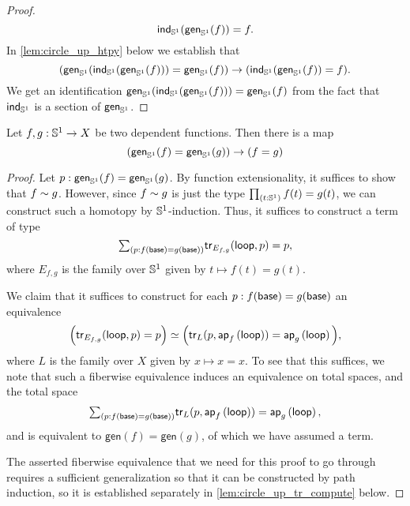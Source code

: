 \begin{proof}
\begin{equation*}
\mathsf{ind}_{\mathbb{S}^{1}}(\mathsf{gen}_{\mathbb{S}^{1}}(f))=f.
\end{equation*}
In \cref{lem:circle_up_htpy} below we establish that
\begin{equation*}
(\mathsf{gen}_{\mathbb{S}^{1}}(\mathsf{ind}_{\mathbb{S}^{1}}(\mathsf{gen}_{\mathbb{S}^{1}}(f)))=\mathsf{gen}_{\mathbb{S}^{1}}(f))\to (\mathsf{ind}_{\mathbb{S}^{1}}(\mathsf{gen}_{\mathbb{S}^{1}}(f))=f).
\end{equation*}
We get an identification $\mathsf{gen}_{\mathbb{S}^{1}}(\mathsf{ind}_{\mathbb{S}^{1}}(\mathsf{gen}_{\mathbb{S}^{1}}(f)))=\mathsf{gen}_{\mathbb{S}^{1}}(f)$ from the fact that $\mathsf{ind}_{\mathbb{S}^{1}}$ is a section of $\mathsf{gen}_{\mathbb{S}^{1}}$.
\end{proof}

\begin{lem}\label{lem:circle_up_htpy}
Let $f,g:\mathbb{S}^{1}\to X$ be two dependent functions. Then there is a map
\begin{equation*}
(\mathsf{gen}_{\mathbb{S}^{1}}(f)=\mathsf{gen}_{\mathbb{S}^{1}}(g))\to (f=g)
\end{equation*}
\end{lem}

\begin{proof}
Let $p:\mathsf{gen}_{\mathbb{S}^{1}}(f)=\mathsf{gen}_{\mathbb{S}^{1}}(g)$. By function extensionality, it suffices to show that $f\sim g$. However, since $f\sim g$ is just the type $\prd{t:\sphere{1}}f(t)=g(t)$, we can construct such a homotopy by $\mathbb{S}^{1}$-induction. Thus, it suffices to construct a term of type
\begin{equation*}
\sm{p:f(\base)=g(\base)} \mathsf{tr}_{E_{f,g}}(\lloop,p)=p, 
\end{equation*}
where $E_{f,g}$ is the family over $\mathbb{S}^{1}$ given by $t\mapsto f(t)=g(t)$.

We claim that it suffices to construct for each $p:f(\mathsf{base})=g(\mathsf{base})$ an equivalence
\begin{equation*}
\Big(\mathsf{tr}_{E_{f,g}}(\mathsf{loop},p)=p\Big)\simeq\Big(\mathsf{tr}_{L}(p,\mathsf{ap}_{f}\left({\mathsf{loop}}\right))=\mathsf{ap}_{g}\left({\mathsf{loop}}\right)\Big),
\end{equation*}
where $L$ is the family over $X$ given by $x\mapsto x=x$. 
To see that this suffices, we note that such a fiberwise equivalence induces an equivalence on total spaces, and the total space
\begin{align*}
\sm{p:f(\base)=g(\base)} \mathsf{tr}_{L}(p,\ap{f}{\lloop})=\ap{g}{\lloop},
\end{align*}
and is equivalent to $\mathsf{gen}(f)=\mathsf{gen}(g)$, of which we have assumed a term.

The asserted fiberwise equivalence that we need for this proof to go through requires a sufficient generalization so that it can be constructed by path induction, so it is established separately in \cref{lem:circle_up_tr_compute} below.
\end{proof}

